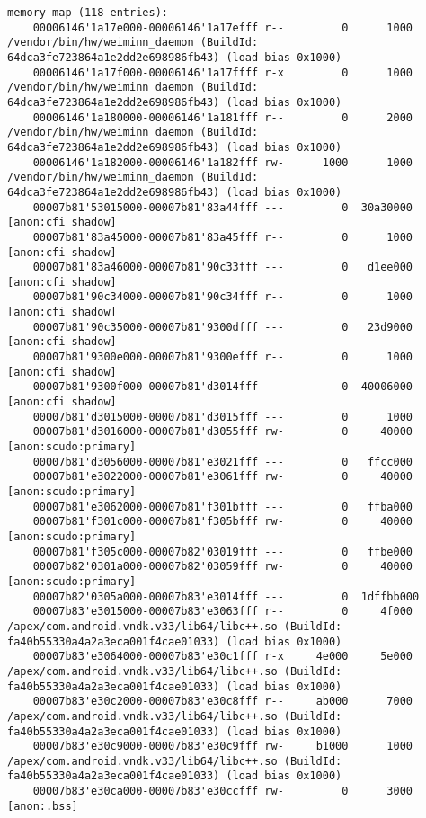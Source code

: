 \begin{lstlisting}
memory map (118 entries):
    00006146'1a17e000-00006146'1a17efff r--         0      1000  /vendor/bin/hw/weiminn_daemon (BuildId: 64dca3fe723864a1e2dd2e698986fb43) (load bias 0x1000)
    00006146'1a17f000-00006146'1a17ffff r-x         0      1000  /vendor/bin/hw/weiminn_daemon (BuildId: 64dca3fe723864a1e2dd2e698986fb43) (load bias 0x1000)
    00006146'1a180000-00006146'1a181fff r--         0      2000  /vendor/bin/hw/weiminn_daemon (BuildId: 64dca3fe723864a1e2dd2e698986fb43) (load bias 0x1000)
    00006146'1a182000-00006146'1a182fff rw-      1000      1000  /vendor/bin/hw/weiminn_daemon (BuildId: 64dca3fe723864a1e2dd2e698986fb43) (load bias 0x1000)
    00007b81'53015000-00007b81'83a44fff ---         0  30a30000  [anon:cfi shadow]
    00007b81'83a45000-00007b81'83a45fff r--         0      1000  [anon:cfi shadow]
    00007b81'83a46000-00007b81'90c33fff ---         0   d1ee000  [anon:cfi shadow]
    00007b81'90c34000-00007b81'90c34fff r--         0      1000  [anon:cfi shadow]
    00007b81'90c35000-00007b81'9300dfff ---         0   23d9000  [anon:cfi shadow]
    00007b81'9300e000-00007b81'9300efff r--         0      1000  [anon:cfi shadow]
    00007b81'9300f000-00007b81'd3014fff ---         0  40006000  [anon:cfi shadow]
    00007b81'd3015000-00007b81'd3015fff ---         0      1000
    00007b81'd3016000-00007b81'd3055fff rw-         0     40000  [anon:scudo:primary]
    00007b81'd3056000-00007b81'e3021fff ---         0   ffcc000
    00007b81'e3022000-00007b81'e3061fff rw-         0     40000  [anon:scudo:primary]
    00007b81'e3062000-00007b81'f301bfff ---         0   ffba000
    00007b81'f301c000-00007b81'f305bfff rw-         0     40000  [anon:scudo:primary]
    00007b81'f305c000-00007b82'03019fff ---         0   ffbe000
    00007b82'0301a000-00007b82'03059fff rw-         0     40000  [anon:scudo:primary]
    00007b82'0305a000-00007b83'e3014fff ---         0  1dffbb000
    00007b83'e3015000-00007b83'e3063fff r--         0     4f000  /apex/com.android.vndk.v33/lib64/libc++.so (BuildId: fa40b55330a4a2a3eca001f4cae01033) (load bias 0x1000)
    00007b83'e3064000-00007b83'e30c1fff r-x     4e000     5e000  /apex/com.android.vndk.v33/lib64/libc++.so (BuildId: fa40b55330a4a2a3eca001f4cae01033) (load bias 0x1000)
    00007b83'e30c2000-00007b83'e30c8fff r--     ab000      7000  /apex/com.android.vndk.v33/lib64/libc++.so (BuildId: fa40b55330a4a2a3eca001f4cae01033) (load bias 0x1000)
    00007b83'e30c9000-00007b83'e30c9fff rw-     b1000      1000  /apex/com.android.vndk.v33/lib64/libc++.so (BuildId: fa40b55330a4a2a3eca001f4cae01033) (load bias 0x1000)
    00007b83'e30ca000-00007b83'e30ccfff rw-         0      3000  [anon:.bss]

\end{lstlisting}
